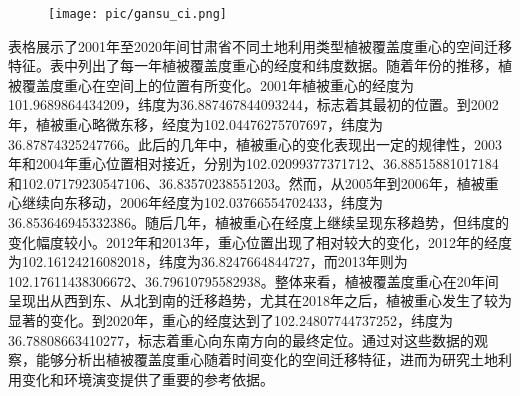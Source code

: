 \documentclass{article}
\begin{document}
				\begin{figure}[H]  %
			\centering
			\texttt{[image: pic/gansu\_ci.png]} %
		\end{figure}
		表格展示了2001年至2020年间甘肃省不同土地利用类型植被覆盖度重心的空间迁移特征。表中列出了每一年植被覆盖度重心的经度和纬度数据。随着年份的推移，植被覆盖度重心在空间上的位置有所变化。2001年植被重心的经度为101.9689864434209，纬度为36.887467844093244，标志着其最初的位置。到2002年，植被重心略微东移，经度为102.04476275707697，纬度为36.87874325247766。此后的几年中，植被重心的变化表现出一定的规律性，2003年和2004年重心位置相对接近，分别为102.02099377371712、36.88515881017184和102.07179230547106、36.83570238551203。然而，从2005年到2006年，植被重心继续向东移动，2006年经度为102.03766554702433，纬度为36.853646945332386。随后几年，植被重心在经度上继续呈现东移趋势，但纬度的变化幅度较小。2012年和2013年，重心位置出现了相对较大的变化，2012年的经度为102.16124216082018，纬度为36.8247664844727，而2013年则为102.17611438306672、36.79610795582938。整体来看，植被覆盖度重心在20年间呈现出从西到东、从北到南的迁移趋势，尤其在2018年之后，植被重心发生了较为显著的变化。到2020年，重心的经度达到了102.24807744737252，纬度为36.78808663410277，标志着重心向东南方向的最终定位。通过对这些数据的观察，能够分析出植被覆盖度重心随着时间变化的空间迁移特征，进而为研究土地利用变化和环境演变提供了重要的参考依据。
		
\end{document}
